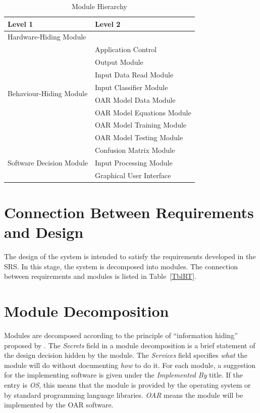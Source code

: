 \documentclass[12pt, titlepage]{article}
\begin{document}
\begin{table}[h!]
\centering
\begin{tabular}{p{} p{}}
\toprule
\textbf{Level 1} & \textbf{Level 2}\\
\midrule
  
{Hardware-Hiding Module} & ~\\
\midrule
  
\multirow{8}{0.3\textwidth}{Behaviour-Hiding Module}
  & Application Control \\
    \cline
  & Output Module\\
  & Input Data Read Module \\
  & Input Classifier Module\\
    \cline
  & OAR Model Data Module \\
  & OAR Model Equations Module \\
  & OAR Model Training Module \\
  & OAR Model Testing Module \\
  \midrule
  
  \multirow{3}{0.3\textwidth}{Software Decision Module}
    & Confusion Matrix Module \\
    \cline
    & Input Processing Module \\
    \cline
    & Graphical User Interface \\
  \bottomrule
  
  \end{tabular}
\caption{Module Hierarchy}
\label{TblMH}
\end{table}

\section{Connection Between Requirements and Design} \label{SecConnection}

The design of the system is intended to satisfy the requirements developed in
the SRS. In this stage, the system is decomposed into modules. The connection
between requirements and modules is listed in Table~\ref{TblRT}.

\section{Module Decomposition} \label{SecMD}

Modules are decomposed according to the principle of ``information hiding''
proposed by \citet{ParnasEtAl1984}. The \emph{Secrets} field in a module
decomposition is a brief statement of the design decision hidden by the
module. The \emph{Services} field specifies \emph{what} the module will do
without documenting \emph{how} to do it. For each module, a suggestion for the
implementing software is given under the \emph{Implemented By} title. If the
entry is \emph{OS}, this means that the module is provided by the operating
system or by standard programming language libraries.  \emph{OAR} means the
module will be implemented by the OAR software.
\end{document}
